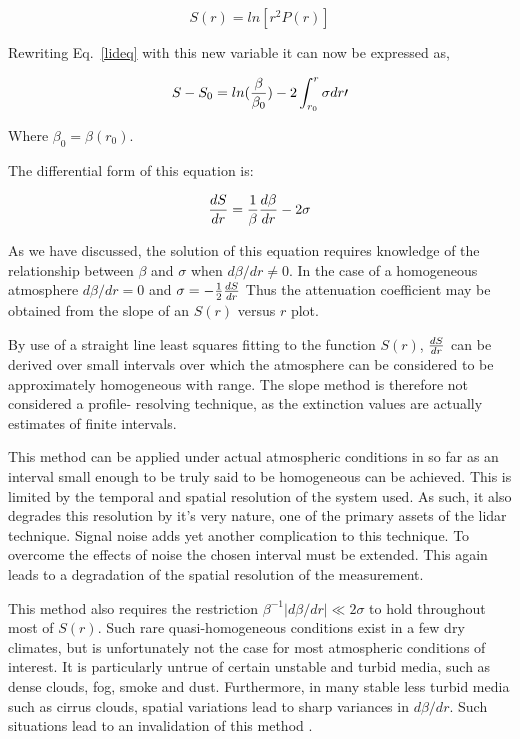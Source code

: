 \begin{equation}
                 S(r)=ln[r^2P(r)]
\label{SR}
\end{equation}

\noindent
Rewriting Eq.~{\ref{lideq}} with this new variable it can now
be expressed as,

\begin{equation}
S-S_0=ln({\beta\over\beta_0})
-2\int_{r_0}^r\sigma dr\prime
\end{equation}

\noindent
Where $\beta_0=\beta(r_0)$.

The differential form of this equation is:

\begin{equation}
{dS\over dr}={1\over\beta}{d\beta\over dr}-2\sigma
\label{difform}
\end{equation}

As we have discussed, the solution 
of this equation requires knowledge of
the relationship between $\beta$ and $\sigma$
when $d\beta/dr \neq 0$. In the case
of a homogeneous atmosphere $d\beta/dr = 0$ and
${\sigma} = -{1\over2}{dS\over dr}$
Thus the attenuation coefficient
may be obtained from the slope of an $S(r)$ versus
$r$ plot.

By use of a straight line least squares fitting 
to the function $S(r)$, $dS\over dr$ can be
derived over small intervals over which 
the atmosphere can be considered to be approximately homogeneous with range. 
The slope method is therefore not considered a profile-
resolving technique, as the extinction values are actually
estimates of finite intervals.

This method can be applied under actual atmospheric
conditions in so far as an interval small enough 
to be truly said to be homogeneous can be achieved.
This is limited by the temporal and spatial
resolution of the system used. As such, it
also degrades this resolution by it's very
nature, one of the primary assets of the
lidar technique. Signal noise adds yet another
complication to this technique. To overcome
the effects of noise the chosen interval must be extended.
This again leads to a degradation of the spatial resolution
of the measurement.

This method also requires the restriction
${{\beta^{-1}}|d\beta/ dr|}\ll{2\sigma}$
to hold throughout most of $S(r)$.
Such rare quasi-homogeneous conditions
exist in a few dry climates, but
is unfortunately not the case
for most atmospheric conditions of interest.
It is particularly untrue of certain unstable and turbid media,
such as dense clouds, fog, smoke and dust.
Furthermore, in many stable less turbid media such 
as cirrus clouds, spatial variations lead
to sharp variances in $d\beta/dr$. Such
situations lead to an invalidation of this method
\cite{agc}\cite{jdk1}.

